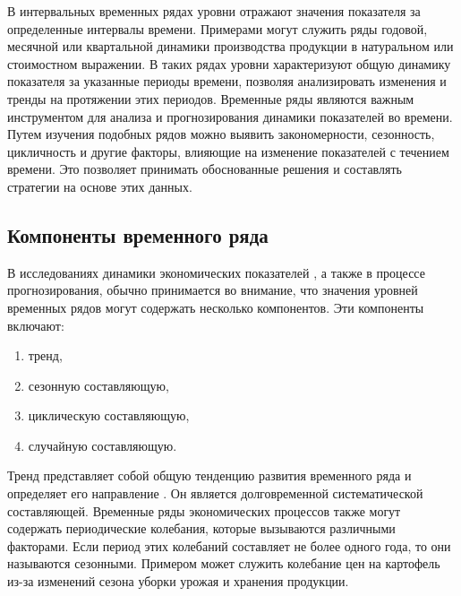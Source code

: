 В интервальных временных рядах уровни отражают значения показателя за определенные интервалы времени. Примерами могут служить ряды годовой, месячной или квартальной динамики производства продукции в натуральном или стоимостном выражении. В таких рядах уровни характеризуют общую динамику показателя за указанные периоды времени, позволяя анализировать изменения и тренды на протяжении этих периодов.
Временные ряды являются важным инструментом для анализа и прогнозирования динамики показателей во времени. Путем изучения подобных рядов можно выявить закономерности, сезонность, цикличность и другие факторы, влияющие на изменение показателей с течением времени. Это позволяет принимать обоснованные решения и составлять стратегии на основе этих данных.

\subsection{Компоненты временного ряда}
В исследованиях динамики экономических показателей \cite{lecture1}, а также в процессе прогнозирования, обычно принимается во внимание, что значения уровней временных рядов могут содержать несколько компонентов. Эти компоненты включают:

\begin{enumerate}
	\item тренд, 
	\item сезонную составляющую, 
	\item циклическую составляющую,
	\item случайную составляющую.
\end{enumerate}

Тренд представляет собой общую тенденцию развития временного ряда и определяет его направление \cite{lecture1}. Он является долговременной систематической составляющей. Временные ряды экономических процессов также могут содержать периодические колебания, которые вызываются различными факторами. Если период этих колебаний составляет не более одного года, то они называются сезонными. Примером может служить колебание цен на картофель из-за изменений сезона уборки урожая и хранения продукции.


